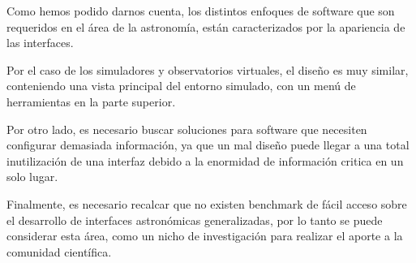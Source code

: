 Como hemos podido darnos cuenta, los distintos
enfoques de software que son requeridos en el área
de la astronomía, están caracterizados por la apariencia
de las interfaces.

Por el caso de los simuladores
y observatorios virtuales, el diseño
es muy similar, conteniendo una vista principal del entorno
simulado, con un menú de herramientas en la parte superior.

Por otro lado, es necesario buscar
soluciones para software que necesiten configurar
demasiada información, ya que un mal diseño
puede llegar a una total inutilización de una interfaz
debido a la enormidad de información critica en un solo lugar.

Finalmente, es necesario recalcar que no existen
benchmark de fácil acceso sobre el desarrollo
de interfaces astronómicas generalizadas,
por lo tanto se puede considerar esta área,
como un nicho de investigación para realizar el aporte
a la comunidad científica.
